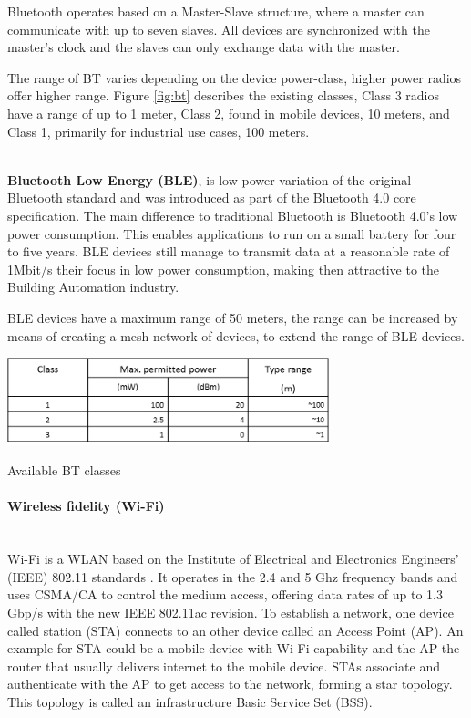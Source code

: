 Bluetooth operates based on a Master-Slave structure, where a master can communicate with up to seven slaves. All devices are synchronized with the master's clock and the slaves can only exchange data with the master.

The range of BT varies depending on the device power-class, higher power radios offer higher range. Figure \ref{fig:bt} describes the existing classes, Class 3 radios have a range of up to 1 meter, Class 2, found in mobile devices, 10 meters, and Class 1, primarily for industrial use cases, 100 meters.

\mbox{}\\
\textbf{Bluetooth Low Energy (BLE)}, is low-power variation of the original Bluetooth standard and was introduced as part of the Bluetooth 4.0 core specification. The main difference to traditional Bluetooth is Bluetooth 4.0's low power consumption. This enables applications to run on a small battery for four to five years. BLE devices still manage to transmit data at a reasonable rate of 1Mbit/s their focus in low power consumption, making then attractive to the Building Automation industry. 

BLE devices have a maximum range of 50 meters, the range can be increased by means of creating a mesh network of devices, to extend the range of BLE devices. 


\begin{table}[h]
\centering
\includegraphics[width=0.7\textwidth]{Figures/bt_tabela1}
\caption{Available BT classes}
\label{fig:bt}
\end{table}


\paragraph{Wireless fidelity (Wi-Fi)}\mbox{}\\

Wi-Fi is a WLAN based on the Institute of Electrical and Electronics Engineers' (IEEE) 802.11 standards \cite{IEEE_wifi,std_802.11,report_802.11}. It operates in the 2.4 and 5 Ghz frequency bands and uses CSMA/CA to control the medium access, offering data rates of up to 1.3 Gbp/s with the new IEEE 802.11ac revision.
To establish a network, one device called station (STA) connects to an other device called an Access Point (AP). An example for STA could be  a mobile device with Wi-Fi capability and the AP the router that usually delivers internet to the mobile device.
STAs associate and authenticate with the AP to get access to the network, forming a star topology. This topology is called an infrastructure Basic Service Set (BSS).

